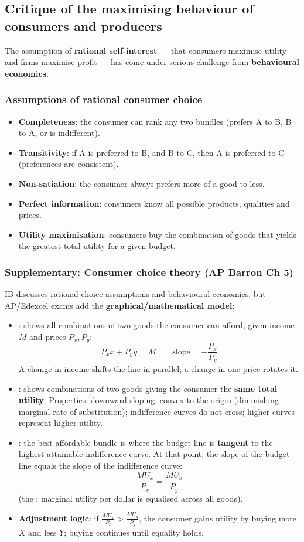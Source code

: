 \subsection{Critique of the maximising behaviour of consumers and producers}
The assumption of \textbf{rational self-interest} --- that consumers maximise utility and firms maximise profit --- has come under serious challenge from \textbf{behavioural economics}.
\subsubsection*{Assumptions of rational consumer choice}
\begin{itemize}
  \item \textbf{Completeness}: the consumer can rank any two bundles (prefers A to B, B to A, or is indifferent).
  \item \textbf{Transitivity}: if A is preferred to B, and B to C, then A is preferred to C (preferences are consistent).
  \item \textbf{Non-satiation}: the consumer always prefers more of a good to less.
  \item \textbf{Perfect information}: consumers know all possible products, qualities and prices.
  \item \textbf{Utility maximisation}: consumers buy the combination of goods that yields the greatest total utility for a given budget.
\end{itemize}
\subsubsection*{Supplementary: Consumer choice theory (AP Barron Ch 5)}
IB discusses rational choice assumptions and behavioural economics, but AP/Edexcel exams add the \textbf{graphical/mathematical model}:
\begin{itemize}
  \item {}: shows all combinations of two goods the consumer can afford, given income $M$ and prices $P_x, P_y$:
  \[P_x x + P_y y = M \qquad \text{slope} = -\dfrac{P_x}{P_y}\]
  A change in income shifts the line in parallel; a change in one price rotates it.
  \item {}: shows combinations of two goods giving the consumer the \textbf{same total utility}. Properties: downward-sloping; convex to the origin (diminishing marginal rate of substitution); indifference curves do not cross; higher curves represent higher utility.
  \item {}: the best affordable bundle is where the budget line is \textbf{tangent} to the highest attainable indifference curve. At that point, the slope of the budget line equals the slope of the indifference curve:
  \[\dfrac{MU_x}{P_x}=\dfrac{MU_y}{P_y}\]
  (the : marginal utility per dollar is equalised across all goods).
  \item \textbf{Adjustment logic}: if $\frac{MU_x}{P_x} > \frac{MU_y}{P_y}$, the consumer gains utility by buying more $X$ and less $Y$; buying continues until equality holds.
\end{itemize}
